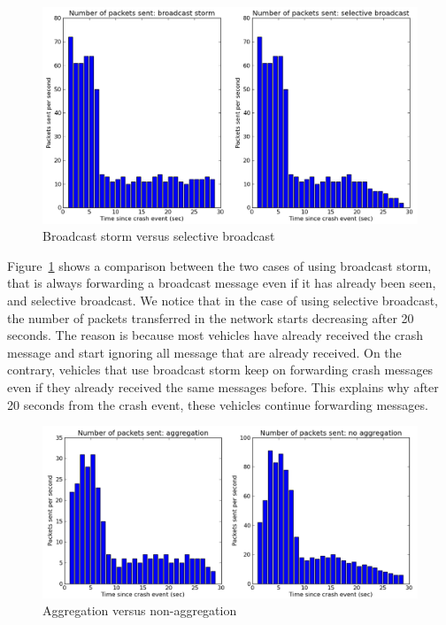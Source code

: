 \documentclass{IEEEtran}
\begin{document}
\noindent
\begin{figure}[h]
\centering
\includegraphics[scale=0.32]{Figure_01.png}
\caption{Broadcast storm versus selective broadcast}
\label{fig_storm_nostorm}
\end{figure}

Figure~\ref{fig_storm_nostorm} shows a comparison between the two cases of using broadcast storm, that is always forwarding a broadcast message even if it has already been seen, and selective broadcast.
We notice that in the case of using selective broadcast, the number of packets transferred in the network starts decreasing after 20 seconds.
The reason is because most vehicles have already received the crash message and start ignoring all message that are already received. On the contrary, vehicles that use broadcast storm keep on forwarding crash messages even if they already received the same messages before.
This explains why after 20 seconds from the crash event, these vehicles continue forwarding messages.

\noindent
\begin{figure}[h]
\centering
\includegraphics[scale=0.32]{Figure_02.png}
\caption{Aggregation versus non-aggregation}
\label{fig_aggregation_nonaggregation}
\end{figure}
\end{document}
